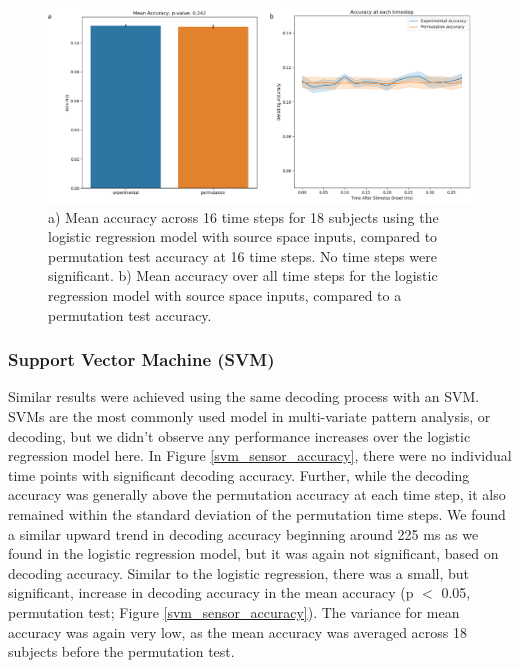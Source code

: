\documentclass[../main.tex]{subfiles}
\begin{document}
\begin{figure}
    \centering
    \includegraphics[scale=0.7]{figures/results/logistic_source_accuracy.png}
    \caption{a) Mean accuracy across 16 time steps for 18 subjects using the logistic regression model with source space inputs, compared to permutation test accuracy at 16 time steps. No time steps were significant. b) Mean accuracy over all time steps for the logistic regression model with source space inputs, compared to a permutation test accuracy.}
    \label{logistic_source_accuracy}
\end{figure}

\subsubsection{Support Vector Machine (SVM)}
Similar results were achieved using the same decoding process with an SVM. SVMs are the most commonly used model in multi-variate pattern analysis, or decoding, but we didn't observe any performance increases over the logistic regression model here. In Figure \ref{svm_sensor_accuracy}, there were no individual time points with significant decoding accuracy. Further, while the decoding accuracy was generally above the permutation accuracy at each time step, it also remained within the standard deviation of the permutation time steps. We found a similar upward trend in decoding accuracy beginning around 225 ms as we found in the logistic regression model, but it was again not significant, based on decoding accuracy. Similar to the logistic regression, there was a small, but significant, increase in decoding accuracy in the mean accuracy (p $<$ 0.05, permutation test; Figure \ref{svm_sensor_accuracy}). The variance for mean accuracy was again very low, as the mean accuracy was averaged across 18 subjects before the permutation test.
\end{document}

